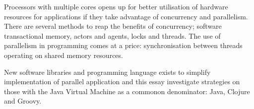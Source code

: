Processors with multiple cores opens up for better utilisation of hardware resources for applications if they take advantage of concurrency and parallelism. There are several methods to reap the benefits of concurrency; software transactional memory, actors and agents, locks and threads. The use of parallelism in programming comes at a price: synchronisation between threads operating on shared memory resources.

New software libraries and programming language exists to simplify implementation of parallel application and this essay investigate strategies on those with the Java Virtual Machine as a commonon denominator: Java, Clojure and Groovy.
\endinput